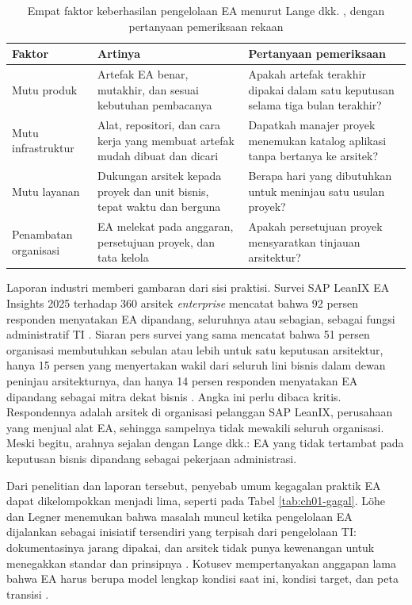 \begin{table}[!htb]
  \centering
  \caption{Empat faktor keberhasilan pengelolaan EA menurut Lange dkk.
           \cite{lange2016}, dengan pertanyaan pemeriksaan rekaan}
  \label{tab:ch01-faktor}
  \footnotesize
  \begin{tabularx}{\textwidth}{>{\raggedright\arraybackslash}p{2.1cm}
      >{\raggedright\arraybackslash}X >{\raggedright\arraybackslash}X}
    \hline
    \textbf{Faktor} & \textbf{Artinya} & \textbf{Pertanyaan pemeriksaan} \\
    \hline
    Mutu produk & Artefak EA benar, mutakhir, dan sesuai kebutuhan pembacanya & Apakah artefak terakhir dipakai dalam satu keputusan selama tiga bulan terakhir? \\
    \hline
    Mutu infrastruktur & Alat, repositori, dan cara kerja yang membuat artefak mudah dibuat dan dicari & Dapatkah manajer proyek menemukan katalog aplikasi tanpa bertanya ke arsitek? \\
    \hline
    Mutu layanan & Dukungan arsitek kepada proyek dan unit bisnis, tepat waktu dan berguna & Berapa hari yang dibutuhkan untuk meninjau satu usulan proyek? \\
    \hline
    Penambatan organisasi & EA melekat pada anggaran, persetujuan proyek, dan tata kelola & Apakah persetujuan proyek mensyaratkan tinjauan arsitektur? \\
    \hline
  \end{tabularx}
\end{table}

Laporan industri memberi gambaran dari sisi praktisi. Survei SAP LeanIX EA
Insights 2025 terhadap 360 arsitek \textit{enterprise} mencatat bahwa 92
persen responden menyatakan EA dipandang, seluruhnya atau sebagian, sebagai
fungsi administratif TI \cite{leanix2025}. Siaran pers survei yang sama
mencatat bahwa 51 persen organisasi membutuhkan sebulan atau lebih untuk satu
keputusan arsitektur, hanya 15 persen yang menyertakan wakil dari seluruh lini
bisnis dalam dewan peninjau arsitekturnya, dan hanya 14 persen responden
menyatakan EA dipandang sebagai mitra dekat bisnis \cite{c01-leanix2025rilis}.
Angka ini perlu dibaca kritis. Respondennya adalah arsitek di organisasi
pelanggan SAP LeanIX, perusahaan yang menjual alat EA, sehingga sampelnya
tidak mewakili seluruh organisasi. Meski begitu, arahnya sejalan dengan Lange
dkk.: EA yang tidak tertambat pada keputusan bisnis dipandang sebagai
pekerjaan administrasi.

Dari penelitian dan laporan tersebut, penyebab umum kegagalan praktik EA
dapat dikelompokkan menjadi lima, seperti pada Tabel \ref{tab:ch01-gagal}.
Löhe dan Legner menemukan bahwa masalah muncul ketika pengelolaan EA
dijalankan sebagai inisiatif tersendiri yang terpisah dari pengelolaan TI:
dokumentasinya jarang dipakai, dan arsitek tidak punya kewenangan untuk
menegakkan standar dan prinsipnya \cite{c01-lohe2014}. Kotusev mempertanyakan
anggapan lama bahwa EA harus berupa model lengkap kondisi saat ini, kondisi
target, dan peta transisi \cite{kotusev2019}.


